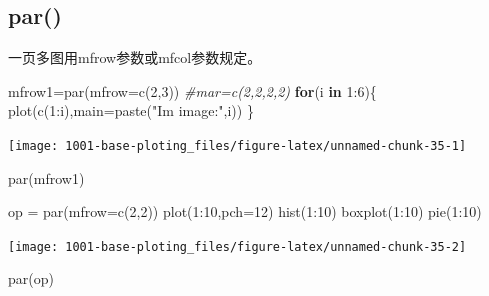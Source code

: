 \documentclass[
]{book}
\newenvironment{Shaded}{\begin{snugshade}}{\end{snugshade}}
\newcommand{\AttributeTok}[1]{\textcolor[rgb]{0.77,0.63,0.00}{#1}}
\newcommand{\CommentTok}[1]{\textcolor[rgb]{0.56,0.35,0.01}{\textit{#1}}}
\newcommand{\ControlFlowTok}[1]{\textcolor[rgb]{0.13,0.29,0.53}{\textbf{#1}}}
\newcommand{\DecValTok}[1]{\textcolor[rgb]{0.00,0.00,0.81}{#1}}
\newcommand{\FunctionTok}[1]{\textcolor[rgb]{0.00,0.00,0.00}{#1}}
\newcommand{\NormalTok}[1]{#1}
\newcommand{\OtherTok}[1]{\textcolor[rgb]{0.56,0.35,0.01}{#1}}
\newcommand{\SpecialCharTok}[1]{\textcolor[rgb]{0.00,0.00,0.00}{#1}}
\newcommand{\StringTok}[1]{\textcolor[rgb]{0.31,0.60,0.02}{#1}}
\begin{document}
\hypertarget{par}{%
\subsection{par()}\label{par}}

一页多图用mfrow参数或mfcol参数规定。

\begin{Shaded}
\begin{Highlighting}[]
\NormalTok{mfrow1}\OtherTok{=}\FunctionTok{par}\NormalTok{(}\AttributeTok{mfrow=}\FunctionTok{c}\NormalTok{(}\DecValTok{2}\NormalTok{,}\DecValTok{3}\NormalTok{)) }\CommentTok{\#mar=c(2,2,2,2)}
\ControlFlowTok{for}\NormalTok{(i }\ControlFlowTok{in} \DecValTok{1}\SpecialCharTok{:}\DecValTok{6}\NormalTok{)\{}
  \FunctionTok{plot}\NormalTok{(}\FunctionTok{c}\NormalTok{(}\DecValTok{1}\SpecialCharTok{:}\NormalTok{i),}\AttributeTok{main=}\FunctionTok{paste}\NormalTok{(}\StringTok{"I\textquotesingle{}m image:"}\NormalTok{,i))}
\NormalTok{\}}
\end{Highlighting}
\end{Shaded}

\begin{center}\texttt{[image: 1001-base-ploting\_files/figure-latex/unnamed-chunk-35-1]} \end{center}

\begin{Shaded}
\begin{Highlighting}[]
\FunctionTok{par}\NormalTok{(mfrow1)}

\NormalTok{op }\OtherTok{=} \FunctionTok{par}\NormalTok{(}\AttributeTok{mfrow=}\FunctionTok{c}\NormalTok{(}\DecValTok{2}\NormalTok{,}\DecValTok{2}\NormalTok{))}
\FunctionTok{plot}\NormalTok{(}\DecValTok{1}\SpecialCharTok{:}\DecValTok{10}\NormalTok{,}\AttributeTok{pch=}\DecValTok{12}\NormalTok{)}
\FunctionTok{hist}\NormalTok{(}\DecValTok{1}\SpecialCharTok{:}\DecValTok{10}\NormalTok{)}
\FunctionTok{boxplot}\NormalTok{(}\DecValTok{1}\SpecialCharTok{:}\DecValTok{10}\NormalTok{)}
\FunctionTok{pie}\NormalTok{(}\DecValTok{1}\SpecialCharTok{:}\DecValTok{10}\NormalTok{)}
\end{Highlighting}
\end{Shaded}

\begin{center}\texttt{[image: 1001-base-ploting\_files/figure-latex/unnamed-chunk-35-2]} \end{center}

\begin{Shaded}
\begin{Highlighting}[]
\FunctionTok{par}\NormalTok{(op)}
\end{Highlighting}
\end{Shaded}
\end{document}
